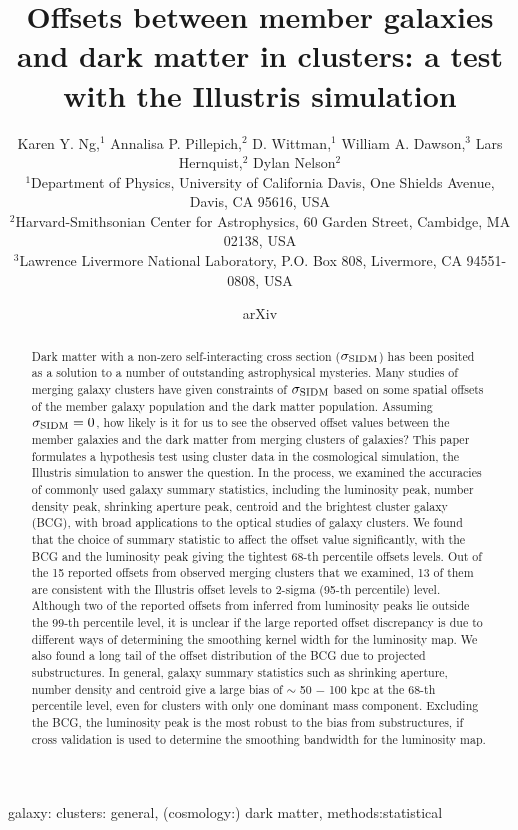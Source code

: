 \documentclass[usenatbib]{mn2e}
\title[
	Offsets between member galaxies and dark matter in clusters: a
test with the Illustris simulation]
{Offsets between member galaxies and dark matter in clusters: a
	test with the Illustris simulation}
\author[Karen Y. Ng et al.]{Karen Y. Ng,$^1$
	Annalisa P. Pillepich,$^2$ 
	D. Wittman,$^1$
	William A. Dawson,$^3$ 
	\newauthor Lars Hernquist,$^{2}$
	Dylan Nelson$^{2}$ \\ 
$^{1}$Department of Physics, University of California Davis, One Shields
Avenue, Davis, CA 95616, USA\\ 
$^{2}$Harvard-Smithsonian Center for Astrophysics, 60 Garden Street, Cambidge,
MA 02138, USA\\
$^{3}$Lawrence Livermore National Laboratory, P.O. Box 808, Livermore, CA 94551-0808, USA \\}
\begin{document}
\date{arXiv} \pagerange{\pageref{firstpage}--\pageref{lastpage}}
 \maketitle\label{firstpage}
\begin{abstract} 
	Dark matter with a non-zero self-interacting cross section ($\sigma_{\rm
	SIDM}$) has been posited
	as a solution to a number of outstanding astrophysical mysteries.
	Many studies of merging galaxy clusters have given constraints of
	$\sigma_{\rm SIDM}$ based on some spatial offsets of the member galaxy
	population and the dark matter population.      
	Assuming $\sigma_{\rm SIDM} = 0$, how likely is
	it for us to see the observed offset values between the member galaxies and
	the dark matter from merging clusters of galaxies? 
	This paper formulates a hypothesis test using cluster data in the cosmological 
	simulation, the Illustris simulation to answer the question. 
	In the process,
	we examined the accuracies of commonly used galaxy summary 
	statistics, including the
	luminosity peak, number density peak, shrinking aperture peak, centroid and
	the brightest cluster galaxy (BCG), with broad applications to the optical studies of
	galaxy clusters. 	
	We found that the choice of summary statistic to affect the offset
	value significantly, with the BCG and the luminosity peak giving the tightest
	68-th percentile offsets levels.  
	Out of the 15 reported offsets from observed merging clusters
	that we examined, 13 of
	them are consistent with the Illustris offset levels to 2-sigma 
	(95-th percentile) level. Although two of the reported offsets from inferred
	from luminosity peaks lie outside the 99-th percentile level, it is unclear
	if the large reported offset discrepancy is due to different ways of
	determining the smoothing kernel width for the luminosity map. 
	We also found a long
	tail of the offset distribution of the BCG due to projected 
	substructures. In general, galaxy summary statistics such as
	shrinking aperture, number density and centroid give a large bias of $\sim$ 50
	$-$ 100 kpc at
	the 68-th percentile level, even for clusters with only one dominant 
	mass component. Excluding the BCG, 
	the luminosity peak is the most 
	robust to the bias from substructures, 
	if cross validation is used to determine
	the smoothing bandwidth for the luminosity map.
\end{abstract}

\begin{keywords}
	galaxy: clusters: general, (cosmology:) dark matter, methods:statistical 
\end{keywords}





\appendix


\clearpage\bsp\label{lastpage} 
\end{document}
